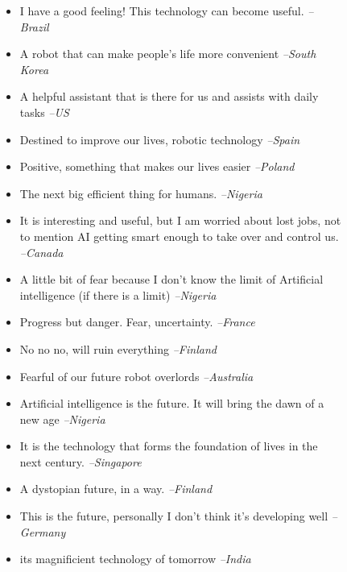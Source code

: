 \documentclass[11pt]{article} %
\newcommand\aff[1]{\textcolor{darkplum}{{\emph{--#1}}}}
\newenvironment{lq1}
{ \begin{itemize}[leftmargin = 0em, label={}]
    \fontsize{8pt}{8.6pt}\selectfont
    \setlength{\itemsep}{2pt}
    \setlength{\parskip}{2pt}
    \setlength{\parsep}{2pt}       }
{ \end{itemize}                    }
\def\Worrying/{{\fontfamily{lmss}\selectfont\textbf{Worrying}}}
\def\Futuristic/{{\fontfamily{lmss}\selectfont\textbf{Futuristic}}}
\begin{document}
\begin{figure}[p]
\begin{multicols}{4}
\begin{lq1}
\item I have a good feeling! This technology can become useful. \aff{Brazil}
\item A robot that can make people's life more convenient \aff{South Korea}
\item A helpful assistant that is there for us and assists with daily tasks \aff{US}
\item Destined to improve our lives, robotic technology \aff{Spain}
\item Positive, something that makes our lives easier \aff{Poland}
\item The next big efficient thing for humans. \aff{Nigeria}
\end{lq1}

\columnbreak

\begin{lq1}
\item It is interesting and useful, but I am worried about lost jobs, not to mention AI getting smart enough to take over and control us. \aff{Canada}
\item A little bit of fear because I don't know the limit of Artificial intelligence (if there is a limit) \aff{Nigeria}
\item Progress but danger. Fear, uncertainty. \aff{France}
\item No no no, will ruin everything \aff{Finland}
\item Fearful of our future robot overlords \aff{Australia}
\end{lq1}

\columnbreak

\begin{lq1}
\item Artificial intelligence is the future. It will bring the dawn of a new age \aff{Nigeria}
\item It is the technology that forms the foundation of lives in the next century. \aff{Singapore}
\item A dystopian future, in a way. \aff{Finland}
\item This is the future, personally I don't think it's developing well \aff{Germany}
\item its magnificient technology of tomorrow \aff{India}
\end{lq1}


\end{multicols}
\end{figure}
\end{document}
